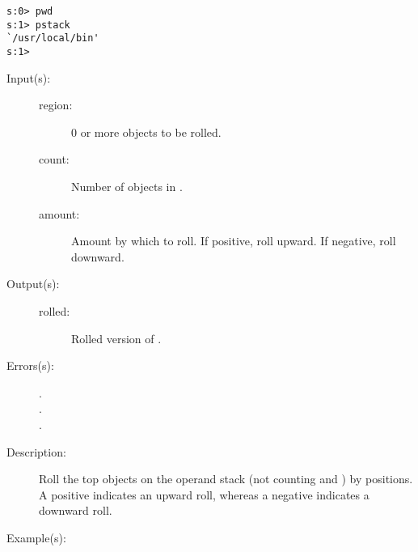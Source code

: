 \begin{description}
\begin{description}
\begin{verbatim}
s:0> pwd
s:1> pstack
`/usr/local/bin'
s:1>
		\end{verbatim}
	\end{description}
\label{systemdict:roll}
\item[{\onyxop{region count amount}{roll}{rolled}}: ]
	\begin{description}\item[]
	\item[Input(s): ]
		\begin{description}\item[]
		\item[region: ]
			0 or more objects to be rolled.
		\item[count: ]
			Number of objects in .
		\item[amount: ]
			Amount by which to roll.  If positive, roll
			upward.  If negative, roll downward.
		\end{description}
	\item[Output(s): ]
		\begin{description}\item[]
		\item[rolled: ]
			Rolled version of .
		\end{description}
	\item[Errors(s): ]
		\begin{description}\item[]
		\item[.]
		\item[.]
		\item[.]
		\end{description}
	\item[Description: ]
		Roll the top  objects on the operand stack
		(not counting  and ) by
		 positions.  A positive 
		indicates an upward roll, whereas a negative 
		indicates a downward roll.
	\item[Example(s): ]\begin{verbatim}


\end{verbatim}
\end{description}
\end{description}
